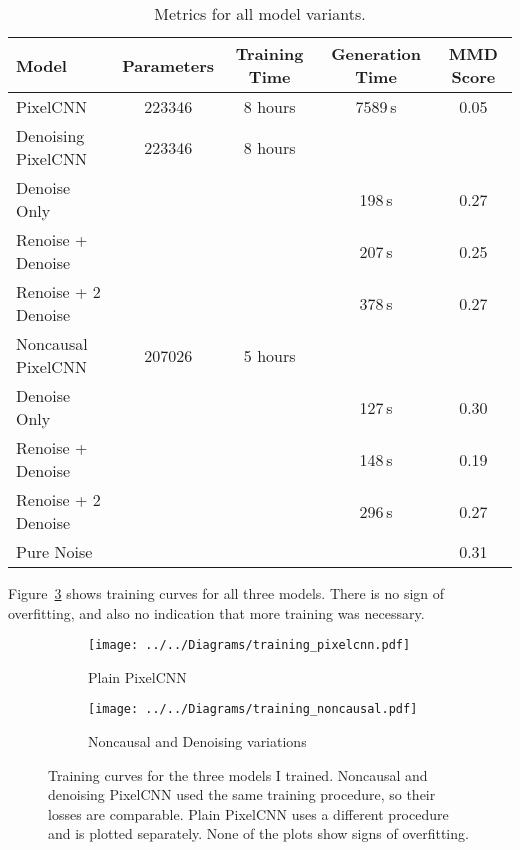 \documentclass[11pt, a4paper, openany]{book}
\begin{document}
\begin{table}
  \centering
{
\sffamily

\begin{tabular}{lcccc}
\\[-2ex]
Model & Parameters &  Training Time & Generation Time & MMD Score\\
\midrule 
PixelCNN & 223346 & 8 hours & 7589\,s & 0.05\\

Denoising PixelCNN & 223346 & 8 hours & &\\
\hspace{0.5cm}Denoise Only & & & 198\,s & 0.27\\
\hspace{0.5cm}Renoise + Denoise & & & 207\,s & 0.25\\
\hspace{0.5cm}Renoise + 2 Denoise & & & 378\,s & 0.27\\


Noncausal PixelCNN & 207026 & 5 hours & &\\
\hspace{0.5cm}Denoise Only & & & 127\,s & 0.30\\
\hspace{0.5cm}Renoise + Denoise & & & 148\,s & 0.19\\
\hspace{0.5cm}Renoise + 2 Denoise & & & 296\,s & 0.27\\

Pure Noise & & & & 0.31\\

\bottomrule
\end{tabular}
}
  \caption[Metrics for all model variants]{Metrics for all model variants.}
  \label{table}
\end{table}

Figure~\ref{trainingcurves} shows training curves for all three models. There is no sign of overfitting, and also no indication that more training was necessary.
  
\begin{figure}
  \centering    
    \begin{subfigure}{0.49\columnwidth}
        \centering
        \caption{Plain PixelCNN}
        \texttt{[image: ../../Diagrams/training\_pixelcnn.pdf]} 
        \label{trainingcurves:pixelcnn}
    \end{subfigure}
    \hfill
    \begin{subfigure}{0.49\columnwidth}
        \centering
        \caption{Noncausal and Denoising variations}
        \texttt{[image: ../../Diagrams/training\_noncausal.pdf]} 
        \label{trainingcurves:noncausal}
    \end{subfigure}
  \caption[Training curves]{Training curves for the three models I trained. Noncausal and denoising PixelCNN used the same training procedure, so their losses are comparable. Plain PixelCNN uses a different procedure and is plotted separately. None of the plots show signs of overfitting.}
  \label{trainingcurves}
\end{figure}
\end{document}
